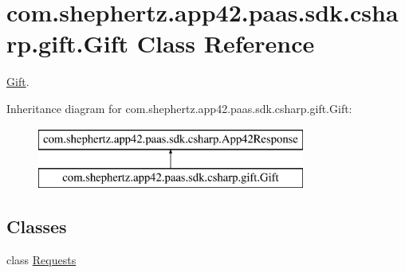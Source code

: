 \hypertarget{classcom_1_1shephertz_1_1app42_1_1paas_1_1sdk_1_1csharp_1_1gift_1_1_gift}{\section{com.\+shephertz.\+app42.\+paas.\+sdk.\+csharp.\+gift.\+Gift Class Reference}
\label{classcom_1_1shephertz_1_1app42_1_1paas_1_1sdk_1_1csharp_1_1gift_1_1_gift}
}


\hyperlink{classcom_1_1shephertz_1_1app42_1_1paas_1_1sdk_1_1csharp_1_1gift_1_1_gift}{Gift}.  


Inheritance diagram for com.\+shephertz.\+app42.\+paas.\+sdk.\+csharp.\+gift.\+Gift\+:\begin{figure}[H]
\begin{center}
\leavevmode
\includegraphics[height=2.000000cm]{classcom_1_1shephertz_1_1app42_1_1paas_1_1sdk_1_1csharp_1_1gift_1_1_gift}
\end{center}
\end{figure}
\subsection*{Classes}
\begin{DoxyCompactItemize}
\item 
class \hyperlink{classcom_1_1shephertz_1_1app42_1_1paas_1_1sdk_1_1csharp_1_1gift_1_1_gift_1_1_requests}{Requests}
\end{DoxyCompactItemize}
